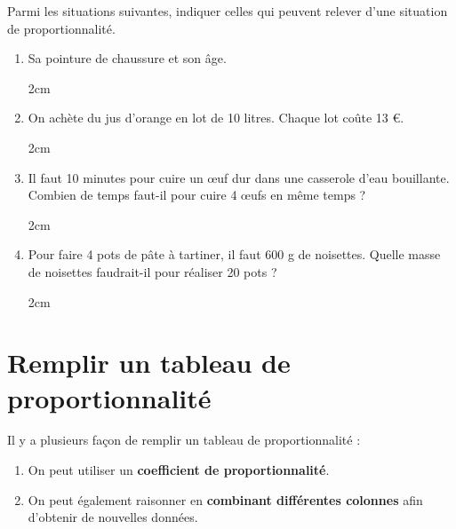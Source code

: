 \documentclass[a4paper]{book}
\begin{document}
    \begin{exemple}
        Parmi les situations suivantes, indiquer celles qui peuvent relever d'une situation de proportionnalité.

        \begin{enumerate}[leftmargin=*]
            \item Sa pointure de chaussure et son âge. 
            \begin{ZoneReponse}{2cm}
            \end{ZoneReponse}

            \item On achète du jus d'orange en lot de 10 litres. Chaque lot coûte 13 €.
            \begin{ZoneReponse}{2cm}
            \end{ZoneReponse}
            
            \item Il faut 10 minutes pour cuire un œuf dur dans une casserole d'eau bouillante. Combien de temps faut-il pour cuire 4 œufs en même temps ?

            \begin{ZoneReponse}{2cm}
            \end{ZoneReponse}

            \item Pour faire 4 pots de pâte à tartiner, il faut 600 g de noisettes. Quelle masse de noisettes faudrait-il pour réaliser 20 pots ? 

            \begin{ZoneReponse}{2cm}
            \end{ZoneReponse}
        \end{enumerate}
    \end{exemple}


\newpage


\section{Remplir un tableau de proportionnalité}
Il y a plusieurs façon de remplir un tableau de proportionnalité :
    \begin{enumerate}[leftmargin=*]
        \item[a)] On peut utiliser un \textbf{coefficient de proportionnalité}.
        \item[b)] On peut également raisonner en \textbf{combinant différentes colonnes} afin d'obtenir de nouvelles données.
    \end{enumerate}
\end{document}
